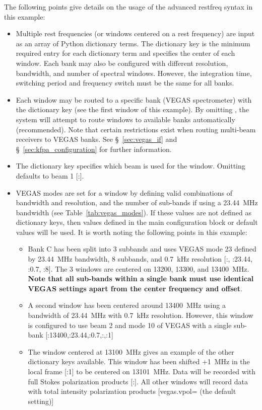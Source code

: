 \noindent
The following points give details on the usage of the advanced restfreq syntax in
this example:
\begin{itemize}
\item Multiple rest frequencies (or windows centered on a rest frequency) are input
as an array of Python dictionary terms.  The  dictionary key
is the minimum required entry for each dictionary term and specifies the center of
each window.  Each bank may also be configured with different resolution, bandwidth,
and number of spectral windows.  However, the integration time, switching period and
frequency switch must be the same for all banks.
\item Each window may be routed to a specific bank (\gls{VEGAS} spectrometer) with
the  dictionary key (see the first window of this example).
By omitting , the system will attempt to route windows to available
banks automatically (recommended).
Note that certain restrictions exist when routing multi-beam receivers to \gls{VEGAS}
banks.  See \S~\ref{sec:vegas_if} and \S~\ref{sec:kfpa_configuration} for further
information.

\item The  dictionary key specifies which beam is used for the
      window. Omitting  defaults to beam 1 [:].
\item {\gls{VEGAS} modes are set for a window by defining valid combinations of
      bandwidth and resolution, and the number of sub-bands if using a 23.44~MHz
      bandwidth (see Table~\ref{tab:vegas_modes}). If these values are not defined
      as dictionary keys, then values defined in the main configuration block or
      default values will be used. It is worth noting the following points in this
      example:}
  \begin{itemize}
  \item {Bank C has been split into 3 subbands and uses \gls{VEGAS} mode 23
        defined by 23.44~MHz bandwidth, 8 subbands, and 0.7~kHz resolution
        [:, :23.44, :0.7, :8].
        The 3 windows are centered on 13200, 13300, and 13400~MHz.
        {\bf Note that all sub-bands within a single bank must use identical
        \gls{VEGAS} settings apart from the center frequency and offset}.}
  \item A second window has been centered around 13400~MHz using a bandwidth of
        23.44~MHz with 0.7~kHz resolution. However, this window is configured to
        use beam 2 and mode 10 of \gls{VEGAS} with a single sub-bank
[{:13400,:23.44,:0.7,:,:1}]
  \item The window centered at 13100~MHz gives an example of the
        other dictionary keys available.  This window has been shifted +1~MHz
        in the local frame [:1] to be centered on 13101~MHz.  Data
        will be recorded with full Stokes polarization products [:].
        All other windows will record data with total intensity polarization
        products [vegas.vpol= (the default setting)]
  \end{itemize}


\end{itemize}
